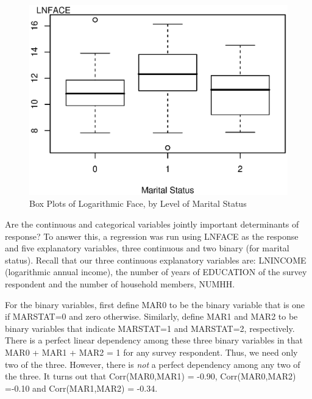 \begin{figure}[htp]
  \begin{center}
    \includegraphics[width=.6\textwidth]{Chapter4/F4BoxFACEMARSTAT.eps}
       \caption{\label{F4:BoxFACEMARSTAT} \small  Box Plots of Logarithmic Face, by Level of Marital Status}
  \end{center}
\end{figure}

Are the continuous and categorical variables jointly important
determinants of response? To answer this, a regression was run using
LNFACE as the response and five explanatory variables, three
continuous and two binary (for marital status). Recall that our
three continuous explanatory variables are:  LNINCOME (logarithmic
annual income), the number of years of EDUCATION of the survey
respondent and the number of household members, NUMHH.

For the binary variables, first define MAR0 to be the binary
variable that is one if MARSTAT=0 and zero otherwise. Similarly,
define MAR1 and MAR2 to be binary variables that indicate MARSTAT=1
and MARSTAT=2, respectively. There is a perfect linear dependency
among these three binary variables in that MAR0 + MAR1 + MAR2 = 1
for any survey respondent. Thus, we need only two of the three.
However, there is \emph{not} a perfect dependency among any two of
the three. It turns out that Corr(MAR0,MAR1) = -0.90,
Corr(MAR0,MAR2) =-0.10 and Corr(MAR1,MAR2) = -0.34.

